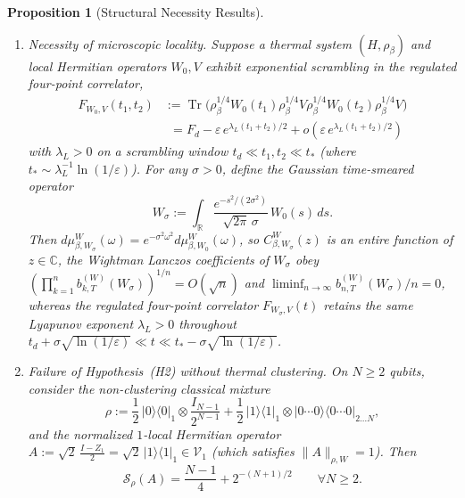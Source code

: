 \documentclass[11pt,a4paper]{article}
\numberwithin{equation}{section}
\theoremstyle{plain}
\newtheorem{proposition}[theorem]{Proposition}
\theoremstyle{definition}
\newcommand{\Tr}{\operatorname{Tr}}
\begin{document}
\begin{proposition}[Structural Necessity Results]\label{prop:nogo}
\begin{enumerate}
  \setlength{\itemsep}{3pt}\setlength{\parskip}{0pt}
  \item[\emph{(1)}] \emph{Necessity of microscopic locality.} Suppose a thermal system $(H,\rho_\beta)$ and local Hermitian operators $W_0, V$ exhibit exponential scrambling in the regulated four-point correlator,
  \begin{align*}
    F_{W_0,V}(t_1,t_2)
    &:= \Tr\!\bigl(\rho_\beta^{1/4}W_0(t_1)\rho_\beta^{1/4}V\rho_\beta^{1/4}W_0(t_2)\rho_\beta^{1/4}V\bigr) \\
    &\phantom{:}= F_d - \varepsilon\,e^{\lambda_L(t_1+t_2)/2} + o\!\left(\varepsilon\,e^{\lambda_L(t_1+t_2)/2}\right)
  \end{align*}
  with $\lambda_L > 0$ on a scrambling window $t_d \ll t_1, t_2 \ll t_*$ (where $t_* \sim \lambda_L^{-1}\ln(1/\varepsilon)$). For any $\sigma > 0$, define the Gaussian time-smeared operator
  \[
    W_\sigma := \int_{\mathbb{R}} \frac{e^{-s^2/(2\sigma^2)}}{\sqrt{2\pi}\,\sigma}\,W_0(s)\,ds.
  \]
  Then $d\mu_{\beta,W_\sigma}^W(\omega) = e^{-\sigma^2\omega^2}d\mu_{\beta,W_0}^W(\omega)$, so $C_{\beta,W_\sigma}^W(z)$ is an entire function of $z\in\mathbb{C}$, the Wightman Lanczos coefficients of $W_\sigma$ obey $(\prod_{k=1}^n b_{k,T}^{(W)}(W_\sigma))^{1/n} = O(\sqrt{n})$ and $\liminf_{n\to\infty} b_{n,T}^{(W)}(W_\sigma)/n = 0$, whereas the regulated four-point correlator $F_{W_\sigma,V}(t)$ retains the same Lyapunov exponent $\lambda_L > 0$ throughout $t_d + \sigma\sqrt{\ln(1/\varepsilon)} \ll t \ll t_* - \sigma\sqrt{\ln(1/\varepsilon)}$.
  \item[\emph{(2)}] \emph{Failure of Hypothesis~\emph{(H2)} without thermal clustering.} On $N\ge 2$ qubits, consider the non-clustering classical mixture
  \begin{equation}\label{eq:bimodal-state}
    \rho := \frac{1}{2}\,|0\rangle\langle 0|_1 \otimes \frac{I_{N-1}}{2^{N-1}}
      + \frac{1}{2}\,|1\rangle\langle 1|_1 \otimes |0\cdots 0\rangle\langle 0\cdots 0|_{2\dots N},
  \end{equation}
  and the normalized $1$-local Hermitian operator $A := \sqrt{2}\,\frac{I - Z_1}{2} = \sqrt{2}\,|1\rangle\langle 1|_1 \in \mathcal{V}_1$ (which satisfies $\|A\|_{\rho,W} = 1$). Then
  \begin{equation}\label{eq:bimodal-size}
    \mathcal{S}_\rho(A) = \frac{N-1}{4} + 2^{-(N+1)/2} \qquad \forall N\ge 2.
  \end{equation}

\end{enumerate}
\end{proposition}
\end{document}

